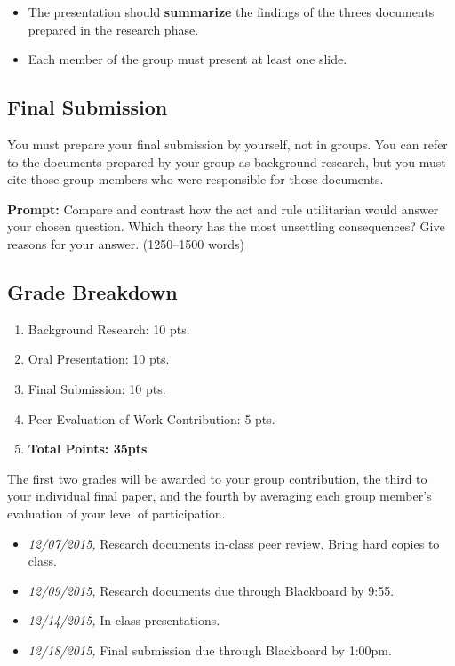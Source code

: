 \documentclass[10pt]{article}
\providecommand{\tightlist}{%
  \setlength{\itemsep}{0pt}\setlength{\parskip}{0pt}}
\begin{document}
\begin{itemize}
\tightlist
\item
  The presentation should \textbf{summarize} the findings of the threes
  documents prepared in the research phase.
\item
  Each member of the group must present at least one slide.
\end{itemize}

\subsection{Final Submission}\label{final-submission}

You must prepare your final submission by yourself, not in groups. You
can refer to the documents prepared by your group as background
research, but you must cite those group members who were responsible for
those documents.

\textbf{Prompt:} Compare and contrast how the act and rule utilitarian
would answer your chosen question. Which theory has the most unsettling
consequences? Give reasons for your answer. (1250--1500 words)

\subsection{Grade Breakdown}\label{grade-breakdown}

\begin{enumerate}
\def\labelenumi{\arabic{enumi}.}
\tightlist
\item
  Background Research: 10 pts.
\item
  Oral Presentation: 10 pts.
\item
  Final Submission: 10 pts.
\item
  Peer Evaluation of Work Contribution: 5 pts.
\item
  \textbf{Total Points: 35pts}
\end{enumerate}

The first two grades will be awarded to your group contribution, the
third to your individual final paper, and the fourth by averaging each
group member's evaluation of your level of participation.

\begin{itemize}

 \item \textit{12/07/2015,} Research documents in-class peer review. Bring hard copies to class.  

\item \textit{12/09/2015,} Research documents due through Blackboard by 9:55. 

\item \textit{12/14/2015,} In-class presentations.


\item \textit{12/18/2015,} Final submission due through Blackboard by 1:00pm. 

\end{itemize}
\end{document}
